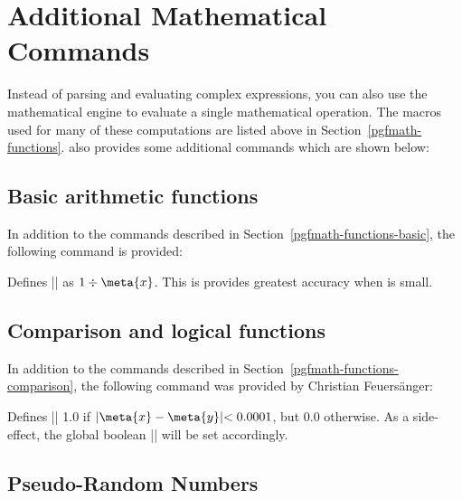 %
%
%

\section{Additional Mathematical Commands}

\label{pgfmath-commands}

Instead of parsing and evaluating complex expressions, you can also
use the mathematical engine to evaluate a single mathematical
operation. The macros used for many of these computations are listed
above in Section~\ref{pgfmath-functions}. \pgfname{} also provides
some additional commands which are shown below:

\subsection{Basic arithmetic functions}

\label{pgfmath-commands-basic}

In addition to the commands described in
Section~\ref{pgfmath-functions-basic}, the following command is
provided:

\begin{command}{\pgfmathreciprocal{}}
	Defines |\pgfmathresult| as $1\div\meta{x}$. This is provides
	greatest accuracy when  is small.
\end{command}

\subsection{Comparison and logical functions}

In addition to the commands described in
Section~\ref{pgfmath-functions-comparison},
the following command was provided by Christian Feuers\"anger:

\begin{command}{\pgfmathapproxequalto{}}
	Defines |\pgfmathresult| 1.0 if $ \rvert \meta{x} - \meta{y} \lvert < 0.0001$, but 0.0 otherwise.
	As a side-effect, the global boolean |\ifpgfmathcomparison| will be set accordingly.
\end{command}

\subsection{Pseudo-Random Numbers}

